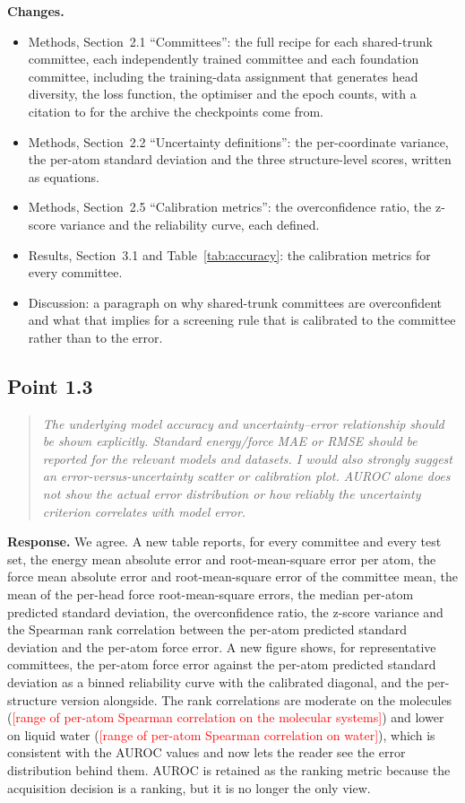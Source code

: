 \documentclass[11pt]{article}
\providecommand{\fsTODO}[1]{\textcolor{red}{[#1]}}
\newcommand{\rpoint}[1]{\begin{quote}\itshape #1\end{quote}}
\newcommand{\response}{\medskip\noindent\textbf{Response.} }
\newcommand{\changes}{\medskip\noindent\textbf{Changes.}}
\begin{document}
\changes
\begin{itemize}
\item Methods, Section~2.1 ``Committees'': the full recipe for each
  shared-trunk committee, each independently trained committee and each
  foundation committee, including the training-data assignment that
  generates head diversity, the loss function, the optimiser and the epoch
  counts, with a citation to \citet{beck2025committee} for the archive the
  checkpoints come from.
\item Methods, Section~2.2 ``Uncertainty definitions'': the per-coordinate
  variance, the per-atom standard deviation and the three structure-level
  scores, written as equations.
\item Methods, Section~2.5 ``Calibration metrics'': the overconfidence ratio,
  the z-score variance and the reliability curve, each defined.
\item Results, Section~3.1 and Table~\ref{tab:accuracy}: the calibration
  metrics for every committee.
\item Discussion: a paragraph on why shared-trunk committees are
  overconfident and what that implies for a screening rule that is calibrated
  to the committee rather than to the error.
\end{itemize}

\subsection*{Point 1.3}
\rpoint{The underlying model accuracy and uncertainty--error relationship
should be shown explicitly. Standard energy/force MAE or RMSE should be
reported for the relevant models and datasets. I would also strongly suggest
an error-versus-uncertainty scatter or calibration plot. AUROC alone does not
show the actual error distribution or how reliably the uncertainty criterion
correlates with model error.}

\response
We agree. A new table reports, for every committee and every test set, the
energy mean absolute error and root-mean-square error per atom, the force
mean absolute error and root-mean-square error of the committee mean, the
mean of the per-head force root-mean-square errors, the median per-atom
predicted standard deviation, the overconfidence ratio, the z-score variance
and the Spearman rank correlation between the per-atom predicted standard
deviation and the per-atom force error. A new figure shows, for
representative committees, the per-atom force error against the per-atom
predicted standard deviation as a binned reliability curve with the
calibrated diagonal, and the per-structure version alongside. The rank
correlations are moderate on the molecules (\fsTODO{range of per-atom
Spearman correlation on the molecular systems}) and lower on liquid water
(\fsTODO{range of per-atom Spearman correlation on water}), which is
consistent with the AUROC values and now lets the reader see the error
distribution behind them. AUROC is retained as the ranking metric because the
acquisition decision is a ranking, but it is no longer the only view.
\end{document}
